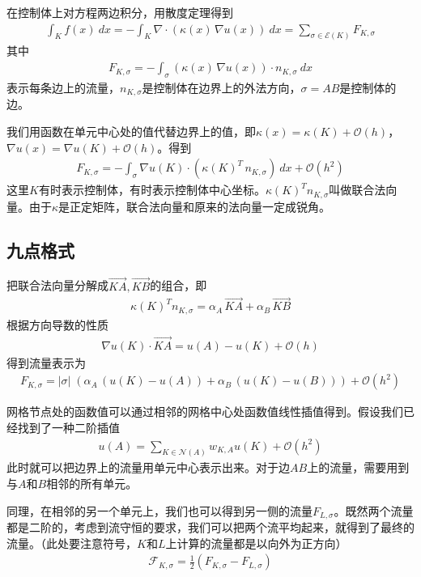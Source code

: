 \documentclass[12pt,a4paper]{article}
\theoremstyle{definition}
\begin{document}
在控制体上对方程两边积分，用散度定理得到
\begin{align*}
\int_{K} f(x) \ dx = - \int_{K} \nabla \cdot (\kappa(x) \, \nabla u(x)) \ dx = \sum_{\sigma \in \mathcal{E}(K)} F_{K, \sigma}
\end{align*}
其中
\begin{align*}
F_{K, \sigma} = - \int_{\sigma} (\kappa(x) \, \nabla u(x)) \cdot n_{K, \sigma} \ dx
\end{align*}
表示每条边上的流量，$n_{K, \sigma}$是控制体在边界上的外法方向，$\sigma = AB$是控制体的边。

我们用函数在单元中心处的值代替边界上的值，即$\kappa(x) = \kappa(K) + \mathcal{O}(h)$，$\nabla u(x) = \nabla u(K) + \mathcal{O}(h)$。得到
\begin{align*}
F_{K, \sigma} = - \int_{\sigma} \nabla u(K) \cdot (\kappa(K)^T \, n_{K, \sigma}) \ dx + \mathcal{O}(h^2)
\end{align*}
这里$K$有时表示控制体，有时表示控制体中心坐标。$\kappa(K)^T n_{K, \sigma}$叫做联合法向量。由于$\kappa$是正定矩阵，联合法向量和原来的法向量一定成锐角。

\subsection{九点格式}

把联合法向量分解成$\overrightarrow{KA}, \overrightarrow{KB}$的组合，即
\begin{align*}
\kappa(K)^T n_{K, \sigma} = \alpha_A \, \overrightarrow{KA} + \alpha_B \, \overrightarrow{KB}
\end{align*}
根据方向导数的性质
\begin{align*}
\nabla u(K) \cdot \overrightarrow{KA} = u(A) - u(K) + \mathcal{O}(h)
\end{align*}
得到流量表示为
\begin{align*}
F_{K, \sigma} = |\sigma| \; (\alpha_A \, (u(K) - u(A)) + \alpha_B \, (u(K) - u(B))) + \mathcal{O}(h^2)
\end{align*}

网格节点处的函数值可以通过相邻的网格中心处函数值线性插值得到。假设我们已经找到了一种二阶插值
\begin{align*}
u(A) = \sum_{K \in \mathcal{N}(A)} w_{K,A} u(K) + \mathcal{O}(h^2)
\end{align*}
此时就可以把边界上的流量用单元中心表示出来。对于边$AB$上的流量，需要用到与$A$和$B$相邻的所有单元。

同理，在相邻的另一个单元上，我们也可以得到另一侧的流量$F_{L, \sigma}$。既然两个流量都是二阶的，考虑到流守恒的要求，我们可以把两个流平均起来，就得到了最终的流量。（此处要注意符号，$K$和$L$上计算的流量都是以向外为正方向）
\begin{align*}
\mathcal{F}_{K, \sigma} = \frac12 (F_{K, \sigma} - F_{L, \sigma})
\end{align*}
\end{document}
